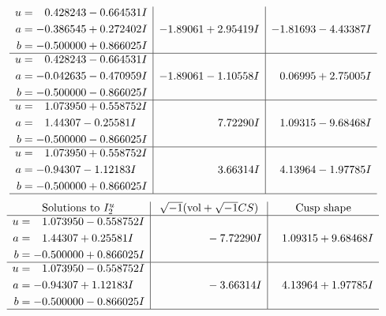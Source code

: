 \documentclass[1p]{elsarticle_modified}
\theoremstyle{definition}
\newcommand{\I}{\sqrt{-1}}
\begin{document}
$$\begin{array}{c|c|c}
\begin{aligned}
u &= \phantom{-}0.428243 - 0.664531 I \\
a &= -0.386545 + 0.272402 I \\
b &= -0.500000 + 0.866025 I\end{aligned}
 & -1.89061 + 2.95419 I & -1.81693 - 4.43387 I \\ \hline\begin{aligned}
u &= \phantom{-}0.428243 - 0.664531 I \\
a &= -0.042635 - 0.470959 I \\
b &= -0.500000 - 0.866025 I\end{aligned}
 & -1.89061 - 1.10558 I & \phantom{-}0.06995 + 2.75005 I \\ \hline\begin{aligned}
u &= \phantom{-}1.073950 + 0.558752 I \\
a &= \phantom{-}1.44307 - 0.25581 I \\
b &= -0.500000 - 0.866025 I\end{aligned}
 & \phantom{-0.000000 -}7.72290 I & \phantom{-}1.09315 - 9.68468 I \\ \hline\begin{aligned}
u &= \phantom{-}1.073950 + 0.558752 I \\
a &= -0.94307 - 1.12183 I \\
b &= -0.500000 + 0.866025 I\end{aligned}
 & \phantom{-0.000000 -}3.66314 I & \phantom{-}4.13964 - 1.97785 I\\
 \hline 
 \end{array}$$\newpage$$\begin{array}{c|c|c}  
\text{Solutions to }I^u_{2}& \I (\text{vol} + \sqrt{-1}CS) & \text{Cusp shape}\\
 \hline 
\begin{aligned}
u &= \phantom{-}1.073950 - 0.558752 I \\
a &= \phantom{-}1.44307 + 0.25581 I \\
b &= -0.500000 + 0.866025 I\end{aligned}
 & \phantom{-0.000000 } -7.72290 I & \phantom{-}1.09315 + 9.68468 I \\ \hline\begin{aligned}
u &= \phantom{-}1.073950 - 0.558752 I \\
a &= -0.94307 + 1.12183 I \\
b &= -0.500000 - 0.866025 I\end{aligned}
 & \phantom{-0.000000 } -3.66314 I & \phantom{-}4.13964 + 1.97785 I\\
 \hline 
 \end{array}$$\newpage
\end{document}
